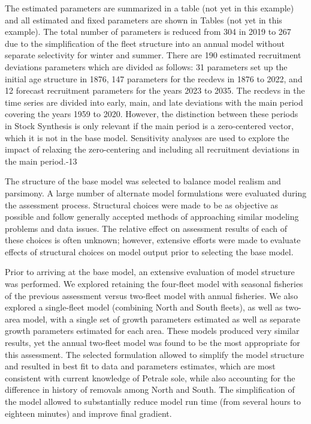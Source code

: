 \documentclass[
]{scrartcl}
\begin{document}
The estimated parameters are summarized in a table (not yet in this
example) and all estimated and fixed parameters are shown in Tables (not
yet in this example). The total number of parameters is reduced from 304
in 2019 to 267 due to the simplification of the fleet structure into an
annual model without separate selectivity for winter and summer. There
are 190 estimated recruitment deviations parameters which are divided as
follows: 31 parameters set up the initial age structure in 1876, 147
parameters for the \textsf{recdevs} in 1876 to 2022, and 12 forecast recruitment
parameters for the years 2023 to 2035. The \textsf{recdevs} in the time series are
divided into early, main, and late deviations with the main period
covering the years 1959 to 2020. However, the distinction between these
periods in Stock Synthesis is only relevant if the main period is a
zero-centered vector, which it is not in the base model. Sensitivity
analyses are used to explore the impact of relaxing the zero-centering
and including all recruitment deviations in the main period.-13 %

The structure of the base model was selected to balance model realism
and parsimony. A large number of alternate model formulations were
evaluated during the assessment process. Structural choices were made to
be as objective as possible and follow generally accepted methods of
approaching similar modeling problems and data issues. The relative
effect on assessment results of each of these choices is often unknown;
however, extensive efforts were made to evaluate effects of structural
choices on model output prior to selecting the base model.

Prior to arriving at the base model, an extensive evaluation of model
structure was performed. We explored retaining the four-fleet model with
seasonal fisheries of the previous assessment versus two-fleet model
with annual fisheries. We also explored a single-fleet model (combining
North and South fleets), as well as two-area model, with a single set of
growth parameters estimated as well as separate growth parameters
estimated for each area. These models produced very similar results, yet
the annual two-fleet model was found to be the most appropriate for this
assessment. The selected formulation allowed to simplify the model
structure and resulted in best fit to data and parameters estimates,
which are most consistent with current knowledge of Petrale sole, while
also accounting for the difference in history of removals among North
and South. The simplification of the model allowed to substantially
reduce model run time (from several hours to eighteen minutes) and
improve final gradient.
\end{document}
